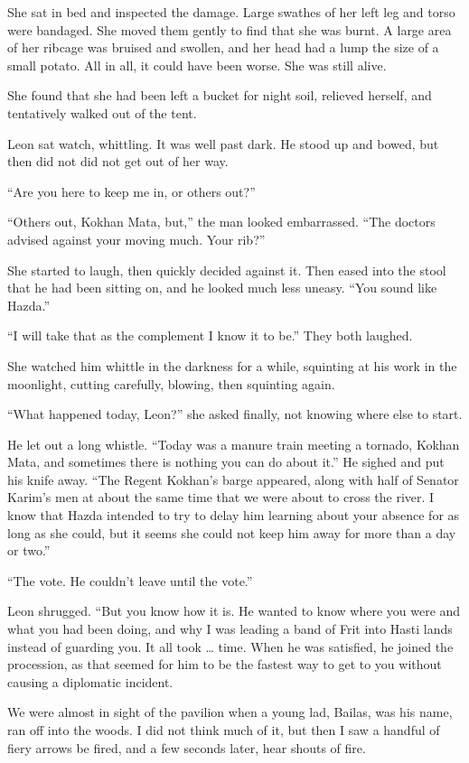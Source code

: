 \documentclass{article}
\begin{document}
	She sat in bed and inspected the damage. Large swathes of her left leg and torso were bandaged. She moved them gently to find that she was burnt. A large area of her ribcage was bruised and swollen, and her head had a lump the size of a small potato. All in all, it could have been worse. She was still alive. 
	
	She found that she had been left a bucket for night soil, relieved herself, and tentatively walked out of the tent.
	
	Leon sat watch, whittling. It was well past dark. He stood up and bowed, but then did not did not get out of her way.
	
	“Are you here to keep me in, or others out?” 
	
	“Others out, Kokhan Mata, but,” the man looked embarrassed. “The doctors advised against your moving much. Your rib?”
	
	She started to laugh, then quickly decided against it. Then eased into the stool that he had been sitting on, and he looked much less uneasy. “You sound like Hazda.” 
	
	“I will take that as the complement I know it to be.” They both laughed.
	
	She watched him whittle in the darkness for a while, squinting at his work in the moonlight, cutting carefully, blowing, then squinting again. 
	
	“What happened today, Leon?” she asked finally, not knowing where else to start.
	
	He let out a long whistle. “Today was a manure train meeting a tornado, Kokhan Mata, and sometimes there is nothing you can do about it.” He sighed and put his knife away. “The Regent Kokhan’s barge appeared, along with half of Senator Karim’s men at about the same time that we were about to cross the river. I know that Hazda intended to try to delay him learning about your absence for as long as she could, but it seems she could not keep him away for more than a day or two.”
	
	“The vote. He couldn’t leave until the vote.”
	
	Leon shrugged. “But you know how it is. He wanted to know where you were and what you had been doing, and why I was leading a band of Frit into Hasti lands instead of guarding you. It all took … time. When he was satisfied, he joined the procession, as that seemed for him to be the fastest way to get to you without causing a diplomatic incident.
	
	We were almost in sight of the pavilion when a young lad, Bailas, was his name, ran off into the woods. I did not think much of it, but then I saw a handful of fiery arrows be fired, and a few seconds later, hear shouts of fire. 
	
\end{document}
